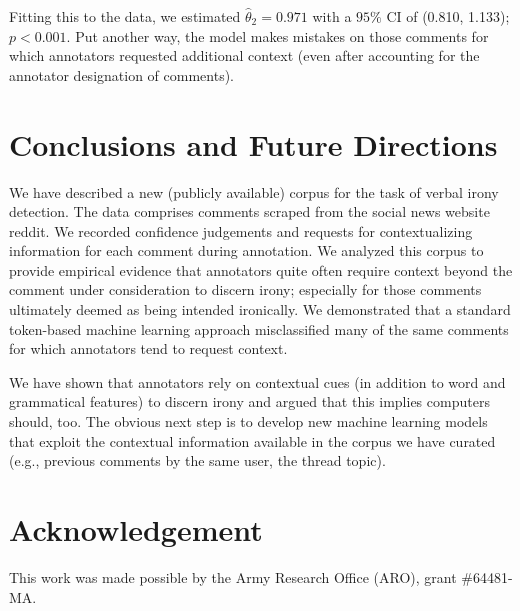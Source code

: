 \documentclass[11pt]{article}
\begin{document}
\noindent Fitting this to the data, we estimated $\hat{\theta}_2=0.971$ with a $95\%$ CI of (0.810, 1.133); $p < 0.001$. Put another way, the model makes mistakes on those comments for which annotators requested additional context (even after accounting for the annotator designation of comments).

\vspace{-.5em}
\section{Conclusions and Future Directions}

We have described a new (publicly available) corpus for the task of verbal irony detection. The data comprises comments scraped from the social news website reddit. We recorded confidence judgements and requests for contextualizing information for each comment during annotation. We analyzed this corpus to provide empirical evidence that annotators quite often require context beyond the comment under consideration to discern irony; especially for those comments ultimately deemed as being intended ironically. We demonstrated that a standard token-based machine learning approach misclassified many of the same comments for which annotators tend to request context.

We have shown that annotators rely on contextual cues (in addition to word and grammatical features) to discern irony and argued that this implies computers should, too. The obvious next step is to develop new machine learning models that exploit the contextual information available in the corpus we have curated (e.g., previous comments by the same user, the thread topic). 

\vspace{-.5em}
\section{Acknowledgement}

This work was made possible by the Army Research Office (ARO), grant \#64481-MA.

\vspace{-1.5em}


\onehalfspacing

\end{document}
